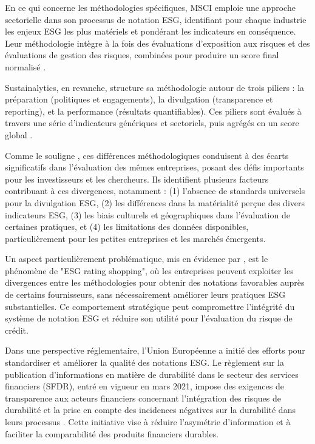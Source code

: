 En ce qui concerne les méthodologies spécifiques, MSCI emploie une approche sectorielle dans son processus de notation ESG, identifiant pour chaque industrie les enjeux ESG les plus matériels et pondérant les indicateurs en conséquence. Leur méthodologie intègre à la fois des évaluations d'exposition aux risques et des évaluations de gestion des risques, combinées pour produire un score final normalisé \citep{comstock2017}.

Sustainalytics, en revanche, structure sa méthodologie autour de trois piliers : la préparation (politiques et engagements), la divulgation (transparence et reporting), et la performance (résultats quantifiables). Ces piliers sont évalués à travers une série d'indicateurs génériques et sectoriels, puis agrégés en un score global \citep{vanderlugt2019}.

Comme le souligne \citet{kotsantonis2019}, ces différences méthodologiques conduisent à des écarts significatifs dans l'évaluation des mêmes entreprises, posant des défis importants pour les investisseurs et les chercheurs. Ils identifient plusieurs facteurs contribuant à ces divergences, notamment : (1) l'absence de standards universels pour la divulgation ESG, (2) les différences dans la matérialité perçue des divers indicateurs ESG, (3) les biais culturels et géographiques dans l'évaluation de certaines pratiques, et (4) les limitations des données disponibles, particulièrement pour les petites entreprises et les marchés émergents.

Un aspect particulièrement problématique, mis en évidence par \citet{dimson2020}, est le phénomène de "ESG rating shopping", où les entreprises peuvent exploiter les divergences entre les méthodologies pour obtenir des notations favorables auprès de certains fournisseurs, sans nécessairement améliorer leurs pratiques ESG substantielles. Ce comportement stratégique peut compromettre l'intégrité du système de notation ESG et réduire son utilité pour l'évaluation du risque de crédit.

Dans une perspective réglementaire, l'Union Européenne a initié des efforts pour standardiser et améliorer la qualité des notations ESG. Le règlement sur la publication d'informations en matière de durabilité dans le secteur des services financiers (SFDR), entré en vigueur en mars 2021, impose des exigences de transparence aux acteurs financiers concernant l'intégration des risques de durabilité et la prise en compte des incidences négatives sur la durabilité dans leurs processus \citep{commission2019}. Cette initiative vise à réduire l'asymétrie d'information et à faciliter la comparabilité des produits financiers durables.

